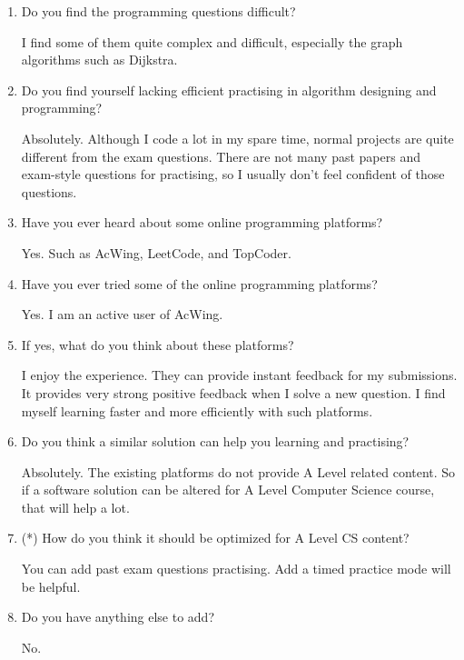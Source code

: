 \documentclass[a4paper]{report}
\begin{document}
\begin{enumerate}
    \item Do you find the programming questions difficult?

          I find some of them quite complex and difficult, especially the graph algorithms such as Dijkstra.

    \item Do you find yourself lacking efficient practising in algorithm designing and programming?

          Absolutely. Although I code a lot in my spare time, normal projects are quite different from the exam questions. There are not many past papers and exam-style questions for practising, so I usually don't feel confident of those questions.

    \item Have you ever heard about some online programming platforms?

          Yes. Such as AcWing, LeetCode, and TopCoder.

    \item Have you ever tried some of the online programming platforms?

          Yes. I am an active user of AcWing.

    \item If yes, what do you think about these platforms?

          I enjoy the experience. They can provide instant feedback for my submissions. It provides very strong positive feedback when I solve a new question. I find myself learning faster and more efficiently with such platforms.

    \item Do you think a similar solution can help you learning and practising?

          Absolutely. The existing platforms do not provide A Level related content. So if a software solution can be altered for A Level Computer Science course, that will help a lot.

    \item (*) How do you think it should be optimized for A Level CS content?

          You can add past exam questions practising. Add a timed practice mode will be helpful.

    \item Do you have anything else to add?

          No.
\end{enumerate}
\end{document}

